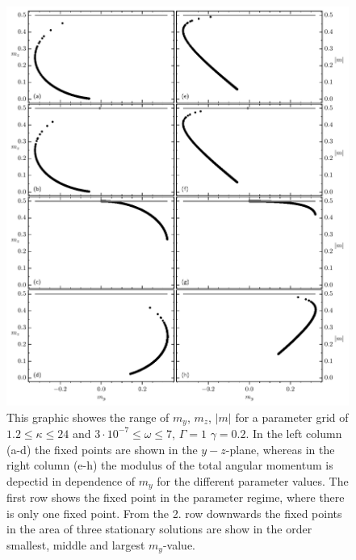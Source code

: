 \documentclass{article}
\begin{document}
\begin{appendices}
\begin{figure}[H]
    \includegraphics{pictures/fixp_boundaries.pdf}
    \caption{This graphic showes the range of $m_y$, $m_z$, $|m|$ for a parameter grid of $1.2\leq\kappa\leq24$ and $3\cdot10^{-7}\leq\omega\leq7$, $\Gamma=1$ $\gamma=0.2$. In the left column (a-d) the fixed points are shown in the $y-z$-plane, whereas in the right column (e-h) the modulus of the total angular momentum is depectid in dependence of $m_y$ for the different parameter values. The first row shows the fixed point in the parameter regime, where there is only one fixed point. From the 2. row downwards the fixed points in the area of three stationary solutions are show in the order smallest, middle and largest $m_y$-value.}
\end{figure}

\end{appendices}

\printbibliography
\end{document}
